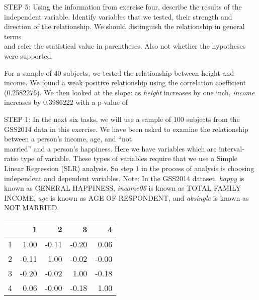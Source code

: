 \documentclass[11pt]{book}\usepackage[]{graphicx}\usepackage[]{color}
\begin{document}
\begin{exercises}
\begin{solution}
    \end{solution}

      \begin{exercise} %


    STEP 5: Using the information from exercise four, describe the results of the independent variable.  Identify variables that we tested, their strength and direction of the relationship.  We should distinguish the relationship in general terms \\ and refer the statistical value in parentheses.  Also not whether the hypotheses were supported.

    \vspace{10mm}

    \end{exercise}
    \begin{solution}      %

    For a sample of 40 subjects, we tested the relationship between height and income.  We found a weak positive relationship using the correlation coefficient (0.2582276).  We then looked at the slope:  as {\textit{height}} increases by one inch, {\textit{income}} increases by 0.3986222 with a p-value of

    \end{solution}

  \begin{exercise} %

    STEP 1:  In the next six tasks, we will use a sample of 100 subjects from the GSS2014 data in this exercise.  We have been asked to examine the relationship between a person's income, age, and ``not \\ married'' and a person's happiness.  Here we have variables which are  interval-ratio type of variable.  These types of variables require that we use a Simple Linear Regression (SLR) analysis.  So step 1 in the process of analysis is choosing independent and dependent variables.  Note: In the GSS2014 dataset, {\textit{happy}} is known as GENERAL HAPPINESS, {\textit{income06}} is known as TOTAL FAMILY INCOME, {\textit{age}} is known as AGE OF RESPONDENT, and {\textit{absingle}} is known as NOT MARRIED.

{\small{
\begin{table}[ht]
\centering
\begin{tabular}{rrrrr}
  \hline
 & 1 & 2 & 3 & 4 \\ 
  \hline
1 & 1.00 & -0.11 & -0.20 & 0.06 \\ 
  2 & -0.11 & 1.00 & -0.02 & -0.00 \\ 
  3 & -0.20 & -0.02 & 1.00 & -0.18 \\ 
  4 & 0.06 & -0.00 & -0.18 & 1.00 \\ 
   \hline
\end{tabular}
\end{table}

}}
\end{exercise}
\end{exercises}
\end{document}

